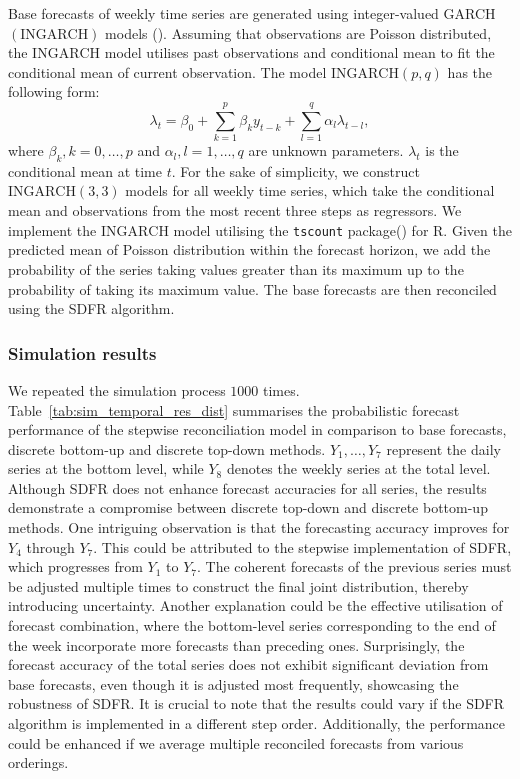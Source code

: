 \documentclass[a4paper,review,12pt,authoryear]{elsarticle}
\let\code=\texttt
\let\proglang=\textsf
\theoremstyle{definition}
\begin{document}
     Base forecasts of weekly time series are generated using integer-valued GARCH $(\textrm{INGARCH})$ models ().
     Assuming that observations are Poisson distributed, the $\textrm{INGARCH}$ model utilises past observations and conditional mean to fit the conditional mean of current observation. The model $\textrm{INGARCH}(p, q)$ has the following form:
     \[
      \lambda_t = \beta_0 + \sum_{k=1}^p \beta_ky_{t-k} + \sum_{l=1}^q \alpha_l\lambda_{t-l}, 
     \] where $\beta_k, k=0,\dots,p$ and $\alpha_l, l=1,\dots,q$ are unknown parameters. $\lambda_t$ is the conditional mean at time $t$.
     For the sake of simplicity, we construct $\textrm{INGARCH}(3, 3)$ models for all weekly time series, which take the conditional mean and observations from the most recent three steps as regressors.
     We implement the $\textrm{INGARCH}$ model utilising the \code{tscount} package() for \proglang{R}.
     Given the predicted mean of Poisson distribution within the forecast horizon, we add the probability of the series taking values greater than its maximum up to the probability of taking its maximum value.
     The base forecasts are then reconciled using the \textrm{SDFR} algorithm.


     \subsubsection{Simulation results}
     We repeated the simulation process $1000$ times.
     Table~\ref{tab:sim_temporal_res_dist} summarises the probabilistic forecast performance of the stepwise reconciliation model in comparison to base forecasts, discrete bottom-up and discrete top-down methods.
     $Y_1,\dots,Y_7$ represent the daily series at the bottom level, while $Y_8$ denotes the weekly series at the total level.
     Although SDFR does not enhance forecast accuracies for all series, the results
     demonstrate a compromise between discrete top-down and discrete bottom-up methods.
     One intriguing observation is that the forecasting accuracy improves for $Y_4$ through $Y_7$.
     This could be attributed to the stepwise implementation of SDFR, which progresses from $Y_1$ to $Y_7$. The coherent forecasts of the previous series must be adjusted multiple times to construct the final joint distribution, thereby introducing uncertainty.
     Another explanation could be the effective utilisation of forecast combination, where the bottom-level series corresponding to the end of the week incorporate more forecasts than preceding ones.
     Surprisingly, the forecast accuracy of the total series does not exhibit significant deviation from base forecasts,  even though it is adjusted most frequently, showcasing the robustness of SDFR.
     It is crucial to note that the results could vary if the SDFR algorithm is implemented in a different step order.
     Additionally, the performance could be enhanced if we average multiple reconciled forecasts from various orderings.
\end{document}
